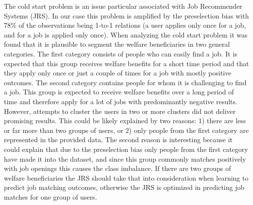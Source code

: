 The cold start problem is an issue particular associated with Job Recommender Systems (JRS). In our case this problem is amplified by the preselection bias with 78\% of the observations being 1-to-1 relations (a user applies only once for a job, and for a job is applied only once). 
When analyzing the cold start problem it was found that it is plausible to segment the welfare beneficiaries in two general categories.
The first category consists of people who can easily find a job. 
It is expected that this group receives welfare benefits for a short time period and that they apply only once or just a couple of times for a job with mostly positive outcomes. 
The second category contains people for whom it is challenging to find a job. 
This group is expected to receive welfare benefits over a long period of time and therefore apply for a lot of jobs with predominantly negative results.
However, attempts to cluster the users in two or more clusters did not deliver promising results.
This could be likely explained by two reasons: 1) there are less or far more than two groups of users, or 2) only people from the first category are represented in the provided data. 
The second reason is interesting because it could explain that due to the preselection bias only people from the first category have made it into the dataset, and since this group commonly matches positively with job openings this causes the class imbalance.
If there are two groups of welfare beneficiaries the JRS should take that into consideration when learning to predict job matching outcomes, otherwise the JRS is optimized in predicting job matches for one group of users. 

